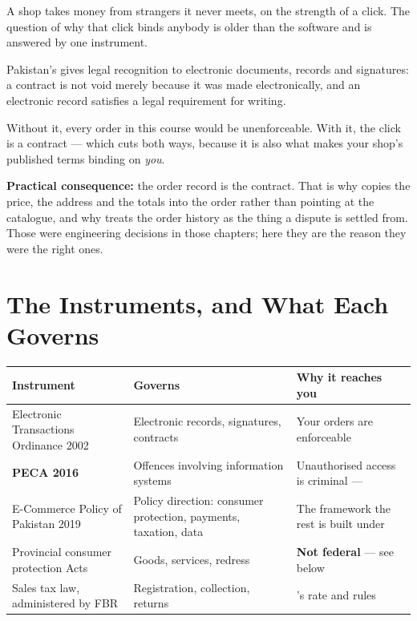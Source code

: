 A shop takes money from strangers it never meets, on the strength of a click.
The question of why that click binds anybody is older than the software and is
answered by one instrument.

\begin{definitionbox}
Pakistan's  gives legal
recognition to electronic documents, records and signatures: a contract is not
void merely because it was made electronically, and an electronic record
satisfies a legal requirement for writing.

\smallskip
Without it, every order in this course would be unenforceable. With it, the
click is a contract --- which cuts both ways, because it is also what makes
your shop's published terms binding on \emph{you}.

\smallskip
\textbf{Practical consequence:} the order record is the contract. That is why
 copies the price, the address and the totals into the order
rather than pointing at the catalogue, and why  treats the order
history as the thing a dispute is settled from. Those were engineering
decisions in those chapters; here they are the reason they were the right ones.
\end{definitionbox}

\section{The Instruments, and What Each Governs}

\begin{longtable}{@{}L{4.6cm}L{4.4cm}L{5.2cm}@{}}
\toprule
{}
\textbf{Instrument} & \textbf{Governs} & \textbf{Why it reaches you} \\
\midrule
\endhead
Electronic Transactions Ordinance 2002 & Electronic records, signatures,
contracts & Your orders are enforceable \\
\textbf{PECA 2016} & Offences involving information systems & Unauthorised
access is criminal ---  \\
E-Commerce Policy of Pakistan 2019 & Policy direction: consumer protection,
payments, taxation, data & The framework the rest is built under \\
Provincial consumer protection Acts & Goods, services, redress & \textbf{Not
federal} --- see below \\
Sales tax law, administered by FBR & Registration, collection, returns &
's rate and rules \\
\bottomrule
\end{longtable}

